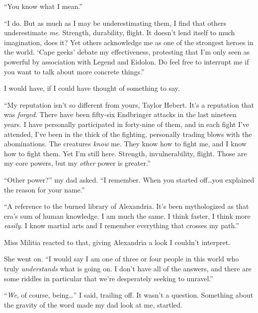 ``You know what I mean.''



``I do.  But as much as I may be underestimating them, I find that others underestimate \emph{me}.  Strength, durability, flight.  It doesn't lend itself to much imagination, does it?  Yet others acknowledge me as one of the strongest heroes in the world.  `Cape geeks' debate my effectiveness, protesting that I'm only seen as powerful by association with Legend and Eidolon.  Do feel free to interrupt me if you want to talk about more concrete things.''



I would have, if I could have thought of something to say.



``My reputation isn't so different from yours, Taylor Hebert.  It's a reputation that was \emph{forged}.  There have been fifty-six Endbringer attacks in the last nineteen years.  I have personally participated in forty-nine of them, and in each fight I've attended, I've been in the thick of the fighting, personally trading blows with the abominations.  The creatures\emph{ know} me.  They know how to fight me, and I know how to fight them.  Yet I'm still here.  Strength, invulnerability, flight.  Those are my core powers, but my \emph{other} power is greater.''



``Other power?'' my dad asked.  ``I remember.  When you started off\ldots you explained the reason for your name.''



``A reference to the burned library of Alexandria.  It's been mythologized as that era's sum of human knowledge.  I am much the same.  I think faster, I think more \emph{easily}.  I know martial arts and I remember everything that crosses my path.''



Miss Militia reacted to that, giving Alexandria a look I couldn't interpret.



She went on.  ``I would say I am one of three or four people in this world who truly \emph{understands} what is going on.  I don't have all of the answers, and there are some riddles in particular that we're desperately seeking to unravel.''



``\emph{We}, of course, being\ldots'' I said, trailing off.  It wasn't a question.  Something about the gravity of the word made my dad look at me, startled.



